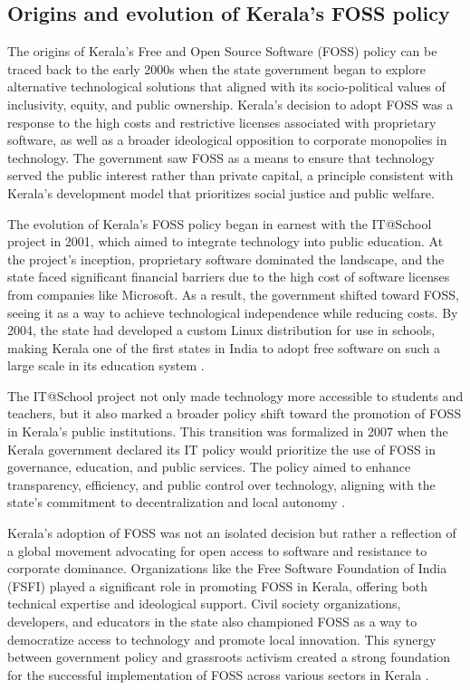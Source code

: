 \begin{refsection}
\subsection{Origins and evolution of Kerala's FOSS policy}

The origins of Kerala’s Free and Open Source Software (FOSS) policy can be traced back to the early 2000s when the state government began to explore alternative technological solutions that aligned with its socio-political values of inclusivity, equity, and public ownership. Kerala's decision to adopt FOSS was a response to the high costs and restrictive licenses associated with proprietary software, as well as a broader ideological opposition to corporate monopolies in technology. The government saw FOSS as a means to ensure that technology served the public interest rather than private capital, a principle consistent with Kerala’s development model that prioritizes social justice and public welfare.

The evolution of Kerala's FOSS policy began in earnest with the IT@School project in 2001, which aimed to integrate technology into public education. At the project's inception, proprietary software dominated the landscape, and the state faced significant financial barriers due to the high cost of software licenses from companies like Microsoft. As a result, the government shifted toward FOSS, seeing it as a way to achieve technological independence while reducing costs. By 2004, the state had developed a custom Linux distribution for use in schools, making Kerala one of the first states in India to adopt free software on such a large scale in its education system \cite{iype2006kerala}.

The IT@School project not only made technology more accessible to students and teachers, but it also marked a broader policy shift toward the promotion of FOSS in Kerala’s public institutions. This transition was formalized in 2007 when the Kerala government declared its IT policy would prioritize the use of FOSS in governance, education, and public services. The policy aimed to enhance transparency, efficiency, and public control over technology, aligning with the state’s commitment to decentralization and local autonomy \cite[pp.~22-23]{kerala2007itpolicy}. 

Kerala's adoption of FOSS was not an isolated decision but rather a reflection of a global movement advocating for open access to software and resistance to corporate dominance. Organizations like the Free Software Foundation of India (FSFI) played a significant role in promoting FOSS in Kerala, offering both technical expertise and ideological support. Civil society organizations, developers, and educators in the state also championed FOSS as a way to democratize access to technology and promote local innovation. This synergy between government policy and grassroots activism created a strong foundation for the successful implementation of FOSS across various sectors in Kerala \cite[pp.~11-13]{palackal2007information}.


\end{refsection}
